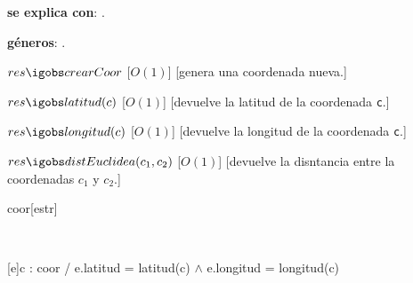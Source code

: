 \begin{Interfaz}


  \textbf{se explica con}: .

  \textbf{g\'eneros}: .



  {$res \igobs crearCoor$}%
  [$O(1)$]
  [genera una coordenada nueva.]


  {$res \igobs latitud(c)$}
  [$O(1)$]
  [devuelve la latitud de la coordenada \texttt{c}.]

  {$res \igobs longitud(c)$}
  [$O(1)$]
  [devuelve la longitud de la coordenada \texttt{c}.]


  {$res \igobs distEuclidea(c_1, c_2)$}%
  [$O(1)$]
  [devuelve la disntancia entre la coordenadas \texttt{$c_1$} y \texttt{$c_2$}.]


\end{Interfaz}

\begin{Representacion}
 
  \begin{Estructura}{coor}[estr]
      \begin{Tupla}[estr]%
    \end{Tupla}
  \end{Estructura}


  ~

  [e]{c : coor / e.latitud = latitud(c) $\land$ e.longitud = longitud(c)}

\end{Representacion}

